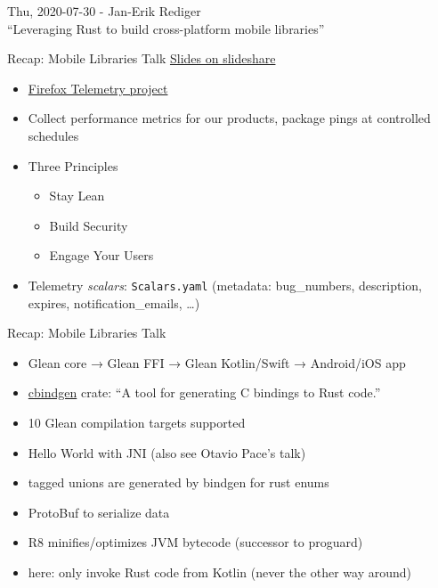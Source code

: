 \documentclass{beamer}
\begin{document}
\begin{frame}[standout]
  Thu, 2020-07-30 - Jan-Erik Rediger \\
  \enquote{Leveraging Rust to build cross-platform mobile libraries}
\end{frame}

\begin{frame}[fragile]{Recap: Mobile Libraries Talk}
  \href{https://www.slideshare.net/NellShamrell/the-rust-borrow-checker}{Slides on slideshare}
  \begin{itemize}
    \item \href{https://telemetry.mozilla.org/}{Firefox Telemetry project}
    \item Collect performance metrics for our products, package pings at controlled schedules
    \item Three Principles
      \begin{itemize}
        \item Stay Lean
        \item Build Security
        \item Engage Your Users
      \end{itemize}
    \item Telemetry \emph{scalars}: \texttt{Scalars.yaml} (metadata: bug\_numbers, description, expires, notification\_emails, \dots)
  \end{itemize}
\end{frame}

\begin{frame}[fragile]{Recap: Mobile Libraries Talk}
  \begin{itemize}
    \item Glean core → Glean FFI → Glean Kotlin/Swift → Android/iOS app
    \item \href{https://crates.io/crates/cbindgen}{cbindgen} crate: \enquote{A tool for generating C bindings to Rust code.}
    \item 10 Glean compilation targets supported
    \item Hello World with JNI (also see Otavio Pace's talk)
    \item tagged unions are generated by bindgen for rust enums
    \item ProtoBuf to serialize data
    \item R8 minifies/optimizes JVM bytecode (successor to proguard)
    \item here: only invoke Rust code from Kotlin (never the other way around)
  \end{itemize}
\end{frame}
\end{document}
